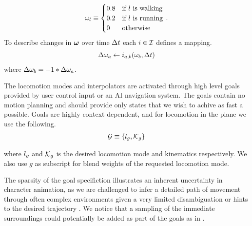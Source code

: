 \begin{equation}
    \label{eq:contribusion:weight:example}
    \omega_l \equiv
    \begin{cases}
    0.8 & \text{if $l$ is walking} \\
    0.2 & \text{if $l$ is running} \\
    0 & \text{otherwise}
    \end{cases}\,.
\end{equation}
To describe changes in $\boldsymbol{\omega }$ over time $\Delta{t}$ each $i \in \mathcal{I}$ defines a mapping. 
\begin{equation}
\Delta{ \omega }_{a} \leftarrow i_{a,b}(\omega_{b}, \Delta{t})
\end{equation}
where $\Delta{ \omega }_{b}=-1*\Delta{ \omega }_{a}$.

The locomotion modes and interpolators are activated through high level goals provided by user control input or an AI navigation system. The goals contain no motion planning and should provide only states that we wish to achive as fast a possible. Goals are highly context dependent, and for locomotion in the plane we use the following.
\begin{subequations}
\begin{align}
     \mathcal{G} &\equiv \left\{ l_g, \mathcal{K}_g \right\} \label{eq:goals:def} \\
\end{align}
\end{subequations}

where $l_g$ and $\mathcal{K}_g$ is the desired locomotion mode and kinematics respectively. We also use $g$ as subscript for blend weights of the requested locomotion mode.

The sparsity of the goal specifiction illustrates an inherent uncertainty in character animation, as we are challenged to infer a detailed path of movement through often complex environments given a very limited disambiguation or hints to the desired trajectory \cite{holden.ea16}. We notice that a sampling of the immediate surroundings could potentially be added as part of the goals as in \cite{holden.ea17}. 

